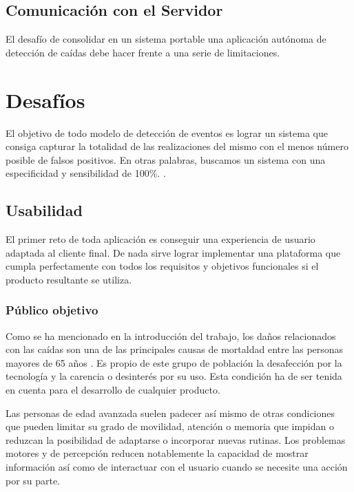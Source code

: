 \subsection{Comunicación con el Servidor}



El desafío de consolidar en un sistema portable una aplicación autónoma de detección de caídas debe hacer frente a una serie de limitaciones.

\section{Desafíos}
 El objetivo de todo modelo de detección de eventos es lograr un sistema que consiga capturar la totalidad de las realizaciones del mismo con el menos número posible de falsos positivos. En otras palabras, buscamos un sistema con una especificidad y sensibilidad de 100\%\cite{Noury2007}. .

\subsection{Usabilidad}
El primer reto de toda aplicación es conseguir una experiencia de usuario adaptada al cliente final. De nada sirve lograr implementar una plataforma que cumpla perfectamente con todos los requisitos y objetivos funcionales si el producto resultante se utiliza.

\subsubsection{Público objetivo}
Como se ha mencionado en la introducción del trabajo, los daños relacionados con las caídas son una de las principales causas de mortaldad entre las personas mayores de 65 años . Es propio de este grupo de población la desafección por la tecnología y la carencia o desinterés por su uso. Esta condición ha de ser tenida en cuenta para el desarrollo de cualquier producto.

Las personas de edad avanzada suelen padecer así mismo de otras condiciones que pueden limitar su grado de movilidad, atención o memoria que impidan o reduzcan la posibilidad de adaptarse o incorporar nuevas rutinas. Los problemas motores y de percepción reducen notablemente la capacidad de mostrar información así como de interactuar con el usuario cuando se necesite una acción por su parte.


